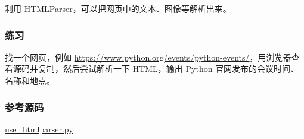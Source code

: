 利用 HTMLParser，可以把网页中的文本、图像等解析出来。

\hypertarget{ux7ec3ux4e60}{%
\subsubsection{练习}\label{ux7ec3ux4e60}}

找一个网页，例如
\url{https://www.python.org/events/python-events/}，用浏览器查看源码并复制，然后尝试解析一下
HTML，输出 Python 官网发布的会议时间、名称和地点。

\hypertarget{ux53c2ux8003ux6e90ux7801}{%
\subsubsection{参考源码}\label{ux53c2ux8003ux6e90ux7801}}

\href{https://github.com/michaelliao/learn-python3/blob/master/samples/commonlib/use_htmlparser.py}{use\_htmlparser.py}

